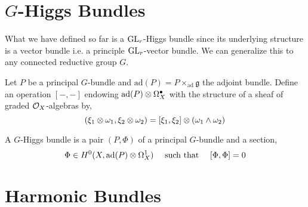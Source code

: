\documentclass[12pt]{article}
\begin{document}
\section{$G$-Higgs Bundles}

What we have defined so far is a $\mathrm{GL}_r$-Higgs bundle since its underlying structure is a vector bundle i.e. a principle $\mathrm{GL}_r$-vector bundle. We can generalize this to any connected reductive group $G$. 


\newcommand{\ad}{\mathrm{ad}}
\newcommand{\g}{\mathfrak{g}}

\begin{defn}
Let $P$ be a principal $G$-bundle and $\ad(P) = P \times_{\ad} \g$ the adjoint bundle. Define an operation $[-,-]$ endowing $\ad(P) \ot \Omega^{\bullet}_X$ with the structure of a sheaf of graded $\mathcal{O}_{X}$-algebras by,
\[ (\xi_1 \otimes \omega_1, \xi_2 \otimes \omega_2) = [\xi_1, \xi_2] \otimes (\omega_1 \wedge \omega_2)  \]
\end{defn}

\begin{defn}
A $G$-Higgs bundle is a pair $(P, \Phi)$ of a principal $G$-bundle and a section,
\[ \Phi \in H^0(X, \ad(P) \ot \Omega_X^1) \quad \text{ such that } \quad [\Phi, \Phi] = 0 \]
\end{defn}

\section{Harmonic Bundles}
\end{document}
